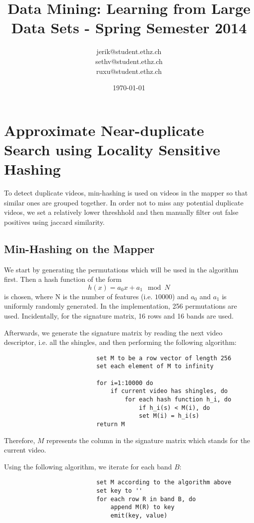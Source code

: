 \documentclass[a4paper, 11pt]{article}
\title{Data Mining: Learning from Large Data Sets - Spring Semester 2014}
\author{jerik@student.ethz.ch\\ sethv@student.ethz.ch\\ ruxu@student.ethz.ch\\}
\date{\today}
\begin{document}
\maketitle

\section{Approximate Near-duplicate Search using Locality Sensitive Hashing} 
To detect duplicate videos, min-hashing is used on videos in the mapper so that similar ones are grouped together. In order not to miss any potential duplicate videos, we set a relatively lower threshhold and then manually filter out false positives using jaccard similarity.

        \subsection{Min-Hashing on the Mapper}
                We start by generating the permutations which will be used in the algorithm first. Then a hash function of the form
                        \[h(x) = a_0x + a_1 \mod N\]
                is chosen, where N is the number of features (i.e. $10000$) and $a_0$ and $a_1$ is uniformly randomly generated. In the implementation, 256 permutations are used. Incidentally, for the signature matrix, 16 rows and 16 bands are used.

                Afterwards, we generate the signature matrix by reading the next video descriptor, i.e. all the shingles, and then performing the following algorithm:
                \begin{verbatim}
                          set M to be a row vector of length 256 
                          set each element of M to infinity

                          for i=1:10000 do
                              if current video has shingles, do
                                  for each hash function h_i, do
                                      if h_i(s) < M(i), do
                                      set M(i) = h_i(s)
                          return M
                \end{verbatim}
                Therefore, $M$ represents the column in the signature matrix which stands for the current video.
                \pagebreak

                Using the following algorithm, we iterate for each band $B$:
                \begin{verbatim}
                          set M according to the algorithm above
                          set key to ''
                          for each row R in band B, do
                              append M(R) to key
                              emit(key, value)
                \end{verbatim}
\end{document}
